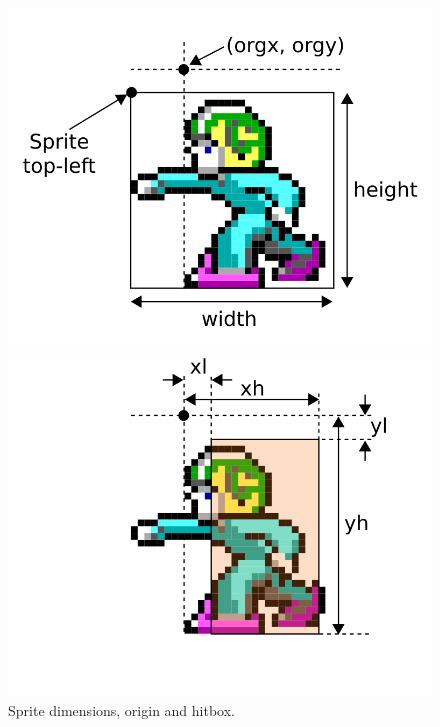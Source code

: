\documentclass[book.tex]{subfiles}
\begin{document}
\par
\begin{figure}[H]
\centering
\begin{minipage}{.5\textwidth}
  \centering
  \includegraphics[width=1.0\linewidth]{imgs/drawings/sprite_origin.png}
\end{minipage}%
\begin{minipage}{.5\textwidth}
  \centering
  \includegraphics[width=1.0\linewidth]{imgs/drawings/sprite_hitbox.png}
\end{minipage}
\caption{Sprite dimensions, origin and hitbox.}
\label{fig:sprite_structure}
\end{figure}
\end{document}
